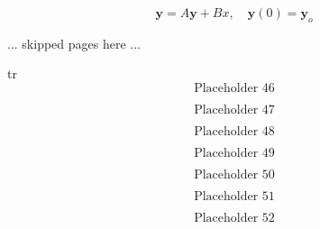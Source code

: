 \documentclass[12pt,reqno]{article}
\newcommand{\vect}[1]{\boldsymbol{#1}} %
\begin{document}
\begin{equation}
    \vect{y} = A\vect{y} + Bx, \hspace{1em} \vect{y}\left(0\right) = \vect{y}_o
\end{equation}


\newpage
\thispagestyle{empty}
\centering
\topskip 0pt
\vspace*{\fill}
... skipped pages here ...
\vspace*{\fill}



\newpage %

\setcounter{equation}{45} %
\setcounter{page}{21} %

tr\begin{equation}
    \text{Placeholder 46}
\end{equation}

\begin{equation}
    \text{Placeholder 47}
\end{equation}

\begin{equation}
    \text{Placeholder 48}
\end{equation}

\begin{equation}
    \text{Placeholder 49}
\end{equation}

\begin{equation}
    \text{Placeholder 50}
\end{equation}

\begin{equation}
    \text{Placeholder 51}
\end{equation}

\begin{equation}
    \text{Placeholder 52}
\end{equation}








\end{document}
